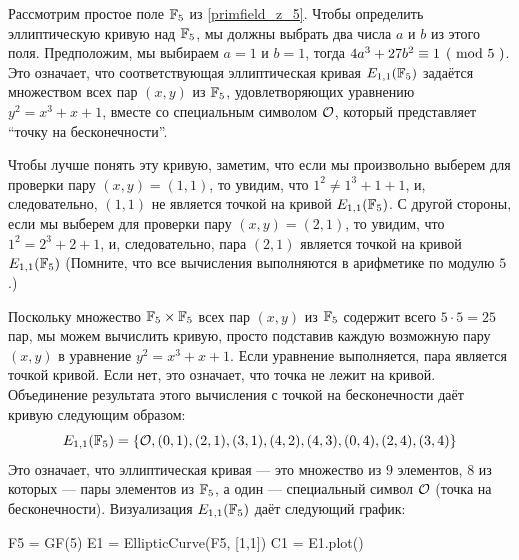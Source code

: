\begin{example}\label{E1F5} Рассмотрим простое поле $\mathbb{F}_5$ из \examplename{} \ref{primfield_z_5}. Чтобы определить эллиптическую кривую над $\mathbb{F}_5$, мы должны выбрать два числа $a$ и $b$ из этого поля. Предположим, мы выбираем $a=1$ и $b=1$, тогда $\kongru{4a^3+ 27b^2}{1}{5}$. Это означает, что соответствующая эллиптическая кривая $E_{1,1}(\mathbb{F}_5)$ задаётся множеством всех пар $(x,y)$ из $\mathbb{F}_5$, удовлетворяющих уравнению $y^2=x^3+x+1$, вместе со специальным символом $\mathcal{O}$, который представляет ``точку на бесконечности''. 

Чтобы лучше понять эту кривую, заметим, что если мы произвольно выберем для проверки пару $(x,y)=(1,1)$, то увидим, что $1^2 \neq 1^3+1 + 1$, и, следовательно, $(1,1)$ не является точкой на кривой $E_{1,1}(\mathbb{F}_5)$. С другой стороны, если мы выберем для проверки пару $(x,y)=(2,1)$, то увидим, что $1^2 = 2^3 + 2 + 1$, и, следовательно, пара $(2,1)$ является точкой на кривой $E_{1,1}(\mathbb{F}_5)$ (Помните, что все вычисления выполняются в арифметике по модулю $5$.)

Поскольку множество $\mathbb{F}_5\times \mathbb{F}_5$ всех пар $(x,y)$ из $\mathbb{F}_5$ содержит всего $5\cdot 5=25$ пар, мы можем вычислить кривую, просто подставив каждую возможную пару $(x,y)$ в уравнение  $y^2 = x^3 + x +1$. Если уравнение выполняется, пара является точкой кривой. Если нет, это означает, что точка не лежит на кривой. Объединение результата этого вычисления с точкой на бесконечности даёт кривую следующим образом:
$$
E_{1,1}(\mathbb{F}_5) = \{\mathcal{O}, (0,1),(2,1),(3,1),(4,2),(4,3),(0,4),(2,4),(3,4)\}
$$
Это означает, что эллиптическая кривая — это множество из $9$ элементов, $8$ из которых — пары элементов из $\mathbb{F}_5$, а один — специальный символ $\mathcal{O}$ (точка на бесконечности). Визуализация $E_{1,1}(\mathbb{F}_5)$ даёт следующий график:
\begin{sagesilent}
F5 = GF(5)
E1 = EllipticCurve(F5, [1,1])
C1 = E1.plot()
\end{sagesilent}
\begin{center} 
\end{center}
\end{example}
